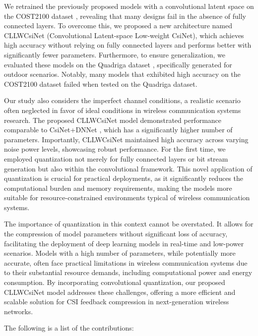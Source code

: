 \documentclass[lettersize,journal]{IEEEtran}
\begin{document}
We retrained the previously proposed models with a convolutional latent space on the COST2100 dataset \cite{abf}, revealing that many designs fail in the absence of fully connected layers. To overcome this, we proposed a new architecture named CLLWCsiNet (Convolutional Latent-space Low-weight CsiNet), which achieves high accuracy without relying on fully connected layers and performs better with significantly fewer parameters. Furthermore, to ensure generalization, we evaluated these models on the Quadriga dataset \cite{abt}, specifically generated for outdoor scenarios. Notably, many models that exhibited high accuracy on the COST2100 dataset \cite{abf} failed when tested on the Quadriga dataset\cite{abt}.

Our study also considers the imperfect channel conditions, a realistic scenario often neglected in favor of ideal conditions in wireless communication systems research. The proposed CLLWCsiNet model demonstrated performance comparable to CsiNet+DNNet \cite{abw}, which has a significantly higher number of parameters. Importantly, CLLWCsiNet maintained high accuracy across varying noise power levels, showcasing robust performance. For the first time, we employed quantization not merely for fully connected layers or bit stream generation but also within the convolutional framework. This novel application of quantization is crucial for practical deployments, as it significantly reduces the computational burden and memory requirements, making the models more suitable for resource-constrained environments typical of wireless communication systems.

The importance of quantization in this context cannot be overstated. It allows for the compression of model parameters without significant loss of accuracy, facilitating the deployment of deep learning models in real-time and low-power scenarios. Models with a high number of parameters, while potentially more accurate, often face practical limitations in wireless communication systems due to their substantial resource demands, including computational power and energy consumption. By incorporating convolutional quantization, our proposed CLLWCsiNet model addresses these challenges, offering a more efficient and scalable solution for CSI feedback compression in next-generation wireless networks.

The following is a list of the contributions:
\end{document}
